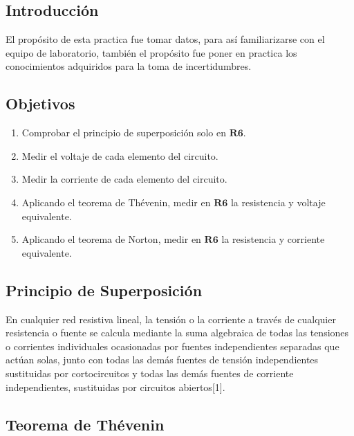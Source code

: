 \documentclass[DIV=calc, paper=a4, fontsize=11pt]{scrartcl}
\begin{document}
\begin{multicols}{2}




\section*{Introducción}
El propósito de esta practica fue tomar datos, para así familiarizarse con el equipo de laboratorio, también el propósito fue poner en practica los conocimientos adquiridos para la toma de incertidumbres.
\subsection*{Objetivos}

\begin{enumerate}
    \item Comprobar el principio de superposición solo en $\mathbf{R6}$.
    
    \item Medir el voltaje de cada elemento del circuito.
    
    \item Medir la corriente de cada elemento del circuito.
    
    \item Aplicando el teorema de Thévenin, medir en $\mathbf{R6}$ la resistencia y voltaje equivalente.
    
    \item Aplicando el teorema de Norton, medir en $\mathbf{R6}$ la resistencia y corriente equivalente.
    
    
\end{enumerate}


\subsection*{Principio de Superposición}

En cualquier red resistiva lineal, la tensión o la corriente a través de cualquier resistencia o
fuente se calcula mediante la suma algebraica de todas las tensiones o corrientes individuales ocasionadas por fuentes independientes separadas que actúan solas, junto con todas las demás
fuentes de tensión independientes sustituidas por cortocircuitos y todas las demás fuentes de
corriente independientes, sustituidas por circuitos abiertos[1].


\subsection*{Teorema de Thévenin}


\end{multicols}
\end{document}
